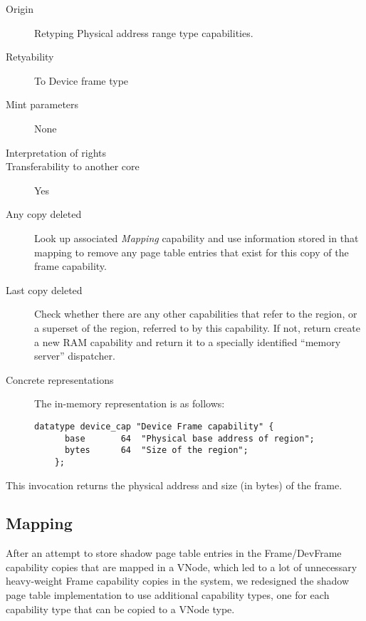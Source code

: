 \begin{description}
\item[Origin] Retyping Physical address range type capabilities.
  
\item[Retyability] To Device frame type
  
\item[Mint parameters] None
  
\item[Interpretation of rights] 
  
\item[Transferability to another core] Yes

\item[Any copy deleted] Look up associated \emph{Mapping} capability and use
  information stored in that mapping to remove any page table entries that
  exist for this copy of the frame capability.

\item[Last copy deleted] Check whether there are any other capabilities that
  refer to the region, or a superset of the region, referred to by this
    capability. If not, return create a new RAM capability and return it to a
    specially identified ``memory server'' dispatcher.
  
\item[Concrete representations] The in-memory representation is as follows:
  
  \begin{lstlisting}[language=Mackerel]
    datatype device_cap "Device Frame capability" {
      base       64  "Physical base address of region";
      bytes      64  "Size of the region";
    };
  \end{lstlisting}
\end{description}  

 This invocation returns the physical
address and size (in bytes) of the frame.

\subsection{Mapping}
After an attempt to store shadow page table entries in the Frame/DevFrame
capability copies that are mapped in a VNode, which led to a lot of
unnecessary heavy-weight Frame capability copies in the system, we redesigned
the shadow page table implementation to use additional capability types, one
for each capability type that can be copied to a VNode type.

